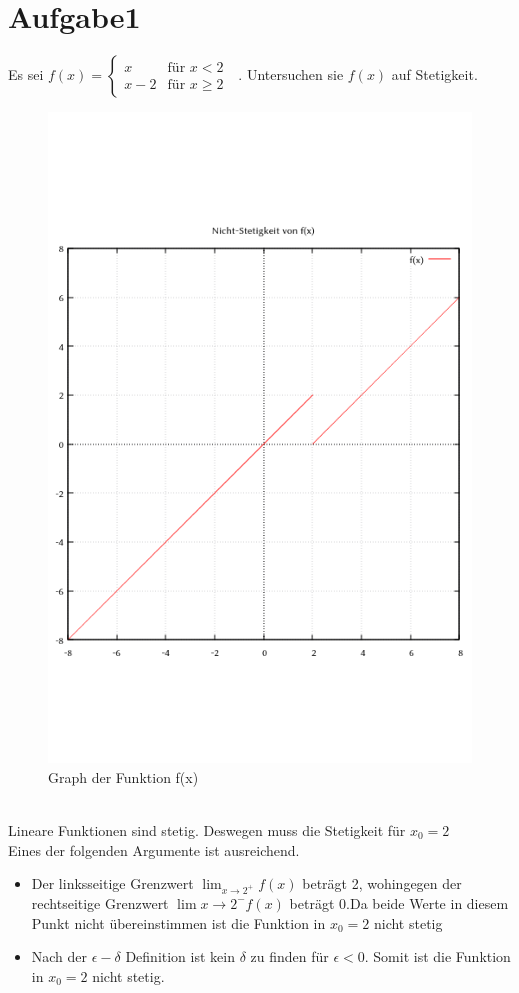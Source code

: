\documentclass[18pt, 4paper]{article}
\begin{document}
\section*{Aufgabe1}
Es sei
\begin{math}
	f(x)=
	\left\{
	\begin{array}{cl}
		x	& \text{für $x<2$}\\
		x-2	& \text{für $x\geq2$ }
      	\end{array}
	\right.
\end{math}. Untersuchen sie $f(x)$ auf Stetigkeit.\\
\begin{figure}[h!]
	\centering
	\includegraphics[scale=0.4]{images/unstetigkeit.png}
	\caption{Graph der Funktion f(x)}
\end{figure}
\hfill\\
Lineare Funktionen sind stetig. Deswegen muss die Stetigkeit für $x_0=2$\\
Eines der folgenden Argumente ist ausreichend.
 \begin{itemize}
	\item Der linksseitige Grenzwert $\lim_{x \to 2^+}{f(x)}$ beträgt 2, wohingegen der rechtseitige Grenzwert $\lim{x \to 2^-}{f(x)}$ beträgt 0.Da beide Werte in diesem Punkt nicht übereinstimmen ist die Funktion in $x_0=2$ nicht stetig
	\item Nach der $\epsilon-\delta$ Definition ist kein $\delta$ zu finden für $\epsilon < 0$. Somit ist die Funktion in $x_0=2$ nicht stetig.
\end{itemize}
\end{document}

